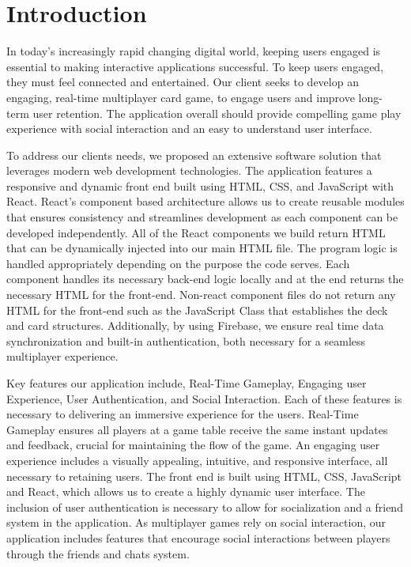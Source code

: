 \section{Introduction}



In today's increasingly rapid changing digital world, keeping users engaged is essential to making interactive applications successful. To keep users engaged, they must feel connected and entertained. Our client seeks to develop an engaging, real-time multiplayer card game, to engage users and improve long-term user retention. The application overall should provide compelling game play experience with social interaction and an easy to understand user interface. 


To address our clients needs, we proposed an extensive software solution that leverages modern web development technologies. The application features a responsive and dynamic front end built using HTML, CSS, and JavaScript with React. React's component based architecture allows us to create reusable modules that ensures consistency and streamlines development as each component can be developed independently. All of the React components we build return HTML that can be dynamically injected into our main HTML file. The program logic is handled appropriately depending on the purpose the code serves. Each component handles its necessary back-end logic locally and at the end returns the necessary HTML for the front-end.  Non-react component files do not return any HTML for the front-end such as the JavaScript Class that establishes the deck and card structures. Additionally, by using Firebase, we ensure real time data synchronization and built-in authentication, both necessary for a seamless multiplayer experience. 


Key features our application include, Real-Time Gameplay, Engaging user Experience, User Authentication, and Social Interaction. Each of these features is necessary to delivering an immersive experience for the users. Real-Time Gameplay ensures all players at a game table receive the same instant updates and feedback, crucial for maintaining the flow of the game. An engaging user experience includes a visually appealing, intuitive, and responsive interface, all necessary to retaining users. The front end is built using HTML, CSS, JavaScript and React, which allows us to create a highly dynamic user interface. The inclusion of user authentication is necessary to allow for socialization and a friend system in the application. As multiplayer games rely on social interaction, our application includes features that encourage social interactions between players through the friends and chats system.


